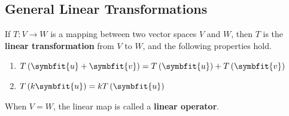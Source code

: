 \documentclass{article}
\begin{document}
\subsection{General Linear Transformations}
\begin{theorem}
    If \(T: V \rightarrow W\) is a mapping between two vector spaces
    \(V\) and \(W\), then \(T\) is the \textbf{linear transformation}
    from \(V\) to \(W\), and the following properties hold.
    \begin{enumerate}
        \item \(T\left(\symbfit{u}+\symbfit{v}\right)=T\left(\symbfit{u}\right) + T\left(\symbfit{v}\right)\)
        \item \(T\left(k\symbfit{u}\right) = kT\left(\symbfit{u}\right)\)
    \end{enumerate}
\end{theorem}
\begin{theorem}
    When \(V=W\), the linear map is called a \textbf{linear operator}.
\end{theorem}
\end{document}

